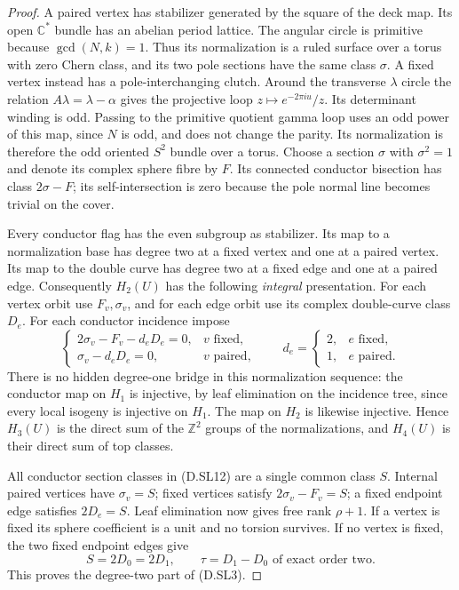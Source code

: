 \begin{proof}
A paired vertex has stabilizer generated by
the square of the deck map. Its open
$\mathbb C^*$ bundle has an abelian period
lattice. The angular circle is primitive
because $\gcd(N,k)=1$. Thus its normalization
is a ruled surface over a torus with zero
Chern class, and its two pole sections have
the same class $\sigma$.
A fixed vertex instead has a pole-interchanging
clutch. Around the transverse $\lambda$ circle
the relation $A\lambda=\lambda-\alpha$ gives
the projective loop
$z\mapsto e^{-2\pi i u}/z$.
Its determinant winding is odd. Passing to
the primitive quotient gamma loop uses an
odd power of this map, since $N$ is odd, and
does not change the parity. Its normalization
is therefore the odd oriented $S^2$ bundle
over a torus. Choose a section $\sigma$ with
$\sigma^2=1$ and denote its complex sphere
fibre by $F$. Its connected conductor
bisection has class $2\sigma-F$; its
self-intersection is zero because the pole
normal line becomes trivial on the cover.

Every conductor flag has the even subgroup
as stabilizer. Its map to a normalization
base has degree two at a fixed vertex and
one at a paired vertex. Its map to the
double curve has degree two at a fixed edge
and one at a paired edge. Consequently
$H_2(U)$ has the following \emph{integral}
presentation. For each vertex orbit use
$F_v,\sigma_v$, and for each edge orbit use
its complex double-curve class $D_e$.
For each conductor incidence impose
\[
 \begin{cases}
 2\sigma_v-F_v-d_eD_e=0,&v\text{ fixed},\\
 \sigma_v-d_eD_e=0,&v\text{ paired},
 \end{cases}
 \qquad d_e=\begin{cases}2,&e\text{ fixed},\\1,&e\text{ paired}.
 \end{cases}                                             \tag{D.SL12}
\]
There is no hidden degree-one bridge in this
normalization sequence: the conductor map
on $H_1$ is injective, by leaf elimination
on the incidence tree, since every local
isogeny is injective on $H_1$. The map on
$H_2$ is likewise injective. Hence
$H_3(U)$ is the direct sum of the
$\mathbb Z^2$ groups of the normalizations,
and $H_4(U)$ is their direct sum of top
classes.

All conductor section classes in (D.SL12)
are a single common class $S$. Internal
paired vertices have $\sigma_v=S$;
fixed vertices satisfy $2\sigma_v-F_v=S$;
a fixed endpoint edge satisfies $2D_e=S$.
Leaf elimination now gives free rank
$\rho+1$. If a vertex is fixed its sphere
coefficient is a unit and no torsion
survives. If no vertex is fixed, the two
fixed endpoint edges give
\[
 S=2D_0=2D_1,\qquad
       \tau=D_1-D_0\text{ of exact order two}.             \tag{D.SL13}
\]
This proves the degree-two part of (D.SL3).


\end{proof}
